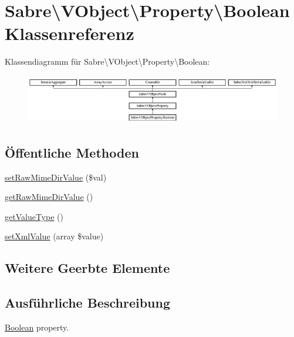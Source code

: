 \hypertarget{class_sabre_1_1_v_object_1_1_property_1_1_boolean}{}\section{Sabre\textbackslash{}V\+Object\textbackslash{}Property\textbackslash{}Boolean Klassenreferenz}
\label{class_sabre_1_1_v_object_1_1_property_1_1_boolean}
Klassendiagramm für Sabre\textbackslash{}V\+Object\textbackslash{}Property\textbackslash{}Boolean\+:\begin{figure}[H]
\begin{center}
\leavevmode
\includegraphics[height=2.164251cm]{class_sabre_1_1_v_object_1_1_property_1_1_boolean}
\end{center}
\end{figure}
\subsection*{Öffentliche Methoden}
\begin{DoxyCompactItemize}
\item 
\mbox{\hyperlink{class_sabre_1_1_v_object_1_1_property_1_1_boolean_a4a7d20201310e3ab1d3be1f33d3ba97a}{set\+Raw\+Mime\+Dir\+Value}} (\$val)
\item 
\mbox{\hyperlink{class_sabre_1_1_v_object_1_1_property_1_1_boolean_a11aea847dcdc2ae091fbfea4dcde7e68}{get\+Raw\+Mime\+Dir\+Value}} ()
\item 
\mbox{\hyperlink{class_sabre_1_1_v_object_1_1_property_1_1_boolean_ae79d5ed76299c11d0d19661e640a8e91}{get\+Value\+Type}} ()
\item 
\mbox{\hyperlink{class_sabre_1_1_v_object_1_1_property_1_1_boolean_a143e7240c75c5c0a73b1d5af4abc9d19}{set\+Xml\+Value}} (array \$value)
\end{DoxyCompactItemize}
\subsection*{Weitere Geerbte Elemente}


\subsection{Ausführliche Beschreibung}
\mbox{\hyperlink{class_sabre_1_1_v_object_1_1_property_1_1_boolean}{Boolean}} property.

